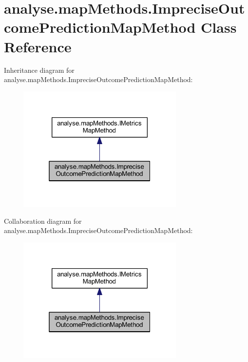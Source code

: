 \hypertarget{classanalyse_1_1map_methods_1_1_imprecise_outcome_prediction_map_method}{}\section{analyse.\+map\+Methods.\+Imprecise\+Outcome\+Prediction\+Map\+Method Class Reference}
\label{classanalyse_1_1map_methods_1_1_imprecise_outcome_prediction_map_method}


Inheritance diagram for analyse.\+map\+Methods.\+Imprecise\+Outcome\+Prediction\+Map\+Method\+:
\nopagebreak
\begin{figure}[H]
\begin{center}
\leavevmode
\includegraphics[width=235pt]{classanalyse_1_1map_methods_1_1_imprecise_outcome_prediction_map_method__inherit__graph}
\end{center}
\end{figure}


Collaboration diagram for analyse.\+map\+Methods.\+Imprecise\+Outcome\+Prediction\+Map\+Method\+:
\nopagebreak
\begin{figure}[H]
\begin{center}
\leavevmode
\includegraphics[width=235pt]{classanalyse_1_1map_methods_1_1_imprecise_outcome_prediction_map_method__coll__graph}
\end{center}
\end{figure}
